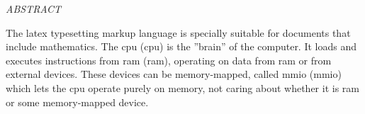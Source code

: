 \begin{center}
\normalfont\LARGE\textit{ABSTRACT}
\end{center}

The \Gls{latex} typesetting markup language is specially suitable for documents that include mathematics.
The \acrlong{cpu} (\acrshort{cpu}) is the ''brain'' of the computer.
It loads and executes instructions from \acrlong{ram} (\acrshort{ram}), operating on data from \acrshort{ram} or from external devices.
These devices can be memory-mapped, called \acrlong{mmio} (\acrshort{mmio}) which lets the \acrshort{cpu} operate purely on memory, not caring about whether it is \acrshort{ram} or some memory-mapped device.

\newpage
